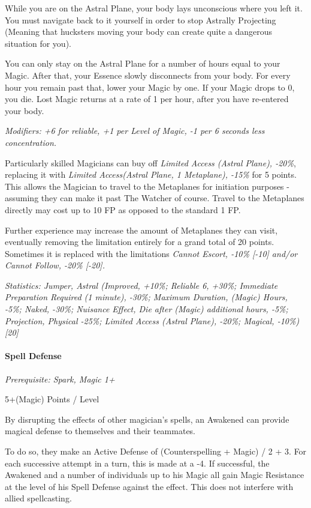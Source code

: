 \begin{multicols*}{3}
	While you are on the Astral Plane, your body lays unconscious where you left it. You must navigate back to it yourself in order to stop Astrally Projecting (Meaning that hucksters moving your body can create quite a dangerous situation for you).
	
	You can only stay on the Astral Plane for a number of hours equal to your Magic. After that, your Essence slowly disconnects from your body. For every hour you remain past that, lower your Magic by one. If your Magic drops to 0, you die. Lost Magic returns at a rate of 1 per hour, after you have re-entered your body.
	
	\textit{\textcolor{NavyBlue}{Modifiers: +6 for reliable, +1 per Level of Magic, -1 per 6 seconds less concentration.}}
	
	Particularly skilled Magicians can buy off \textit{Limited Access (Astral Plane), -20\%}, replacing it with \textit{Limited Access(Astral Plane, 1 Metaplane), -15\%} for 5 points. This allows the Magician to travel to the Metaplanes for initiation purposes - assuming they can make it past The Watcher of course. Travel to the Metaplanes directly may cost up to 10 FP as opposed to the standard 1 FP. 
	
	Further experience may increase the amount of Metaplanes they can visit, eventually removing the limitation entirely for a grand total of 20 points. Sometimes it is replaced with the limitations \textit{Cannot Escort, -10\% [-10] and/or Cannot Follow, -20\% [-20].}
	
	\textit{\textcolor{OliveGreen}{Statistics: Jumper, Astral (Improved, +10\%; Reliable 6, +30\%; Immediate Preparation Required (1 minute), -30\%; Maximum Duration, (Magic) Hours, -5\%; Naked, -30\%; Nuisance Effect, Die after (Magic) additional hours, -5\%; Projection, Physical -25\%;  Limited Access (Astral Plane), -20\%; Magical, -10\%) [20]}}
	
	
	\paragraph{Spell Defense}\label{spell_defense}
	\textit{Prerequisite: Spark, Magic 1+}
	\begin{flushright}
		5+(Magic) Points / Level
	\end{flushright}
	
	By disrupting the effects of other magician's spells, an Awakened can provide magical defense to themselves and their teammates.
	
	To do so, they make an Active Defense of (Counterspelling + Magic) / 2 + 3. For each successive attempt in a turn, this is made at a -4. If successful, the Awakened and a number of individuals up to his Magic all gain Magic Resistance at the level of his Spell Defense against the effect. This does not interfere with allied spellcasting.
	

\end{multicols*}
